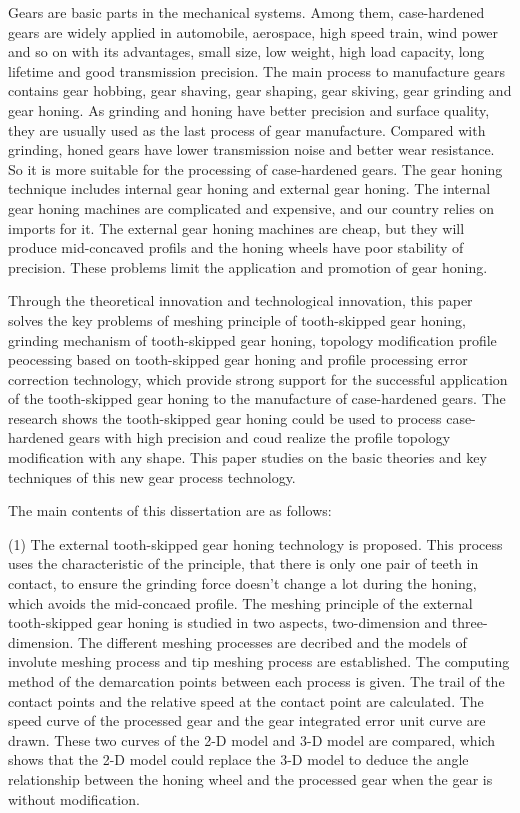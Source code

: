 \begin{enabstract}
  Gears are basic parts in the mechanical systems. Among them, case-hardened
gears are widely applied in automobile, aerospace, high speed train, wind power and
so on with its advantages, small size, low weight, high load capacity, long lifetime and
good transmission precision. The main process to manufacture gears contains gear
hobbing, gear shaving, gear shaping, gear skiving, gear grinding and gear honing. As
grinding and honing have better precision and surface quality, they are usually used as
the last process of gear manufacture. Compared with grinding, honed gears have
lower transmission noise and better wear resistance. So it is more suitable for the
processing of case-hardened gears. The gear honing technique includes internal gear
honing and external gear honing. The internal gear honing machines are complicated
and expensive, and our country relies on imports for it. The external gear honing
machines are cheap, but they will produce mid-concaved profils and the honing
wheels have poor stability of precision. These problems limit the application and
promotion of gear honing.

Through the theoretical innovation and technological innovation, this paper
solves the key problems of meshing principle of tooth-skipped gear honing, grinding
mechanism of tooth-skipped gear honing, topology modification profile peocessing
based on tooth-skipped gear honing and profile processing error correction technology,
which provide strong support for the successful application of the tooth-skipped gear
honing to the manufacture of case-hardened gears. The research shows the
tooth-skipped gear honing could be used to process case-hardened gears with high
precision and coud realize the profile topology modification with any shape. This
paper studies on the basic theories and key techniques of this new gear process
technology.

The main contents of this dissertation are as follows:

(1) The external tooth-skipped gear honing technology is proposed. This process
uses the characteristic of the principle, that there is only one pair of teeth in contact, to
ensure the grinding force doesn’t change a lot during the honing, which avoids the
mid-concaed profile. The meshing principle of the external tooth-skipped gear honing
is studied in two aspects, two-dimension and three-dimension. The different meshing
processes are decribed and the models of involute meshing process and tip meshing
process are established. The computing method of the demarcation points between
each process is given. The trail of the contact points and the relative speed at the
contact point are calculated. The speed curve of the processed gear and the gear
integrated error unit curve are drawn. These two curves of the 2-D model and 3-D
model are compared, which shows that the 2-D model could replace the 3-D model to
deduce the angle relationship between the honing wheel and the processed gear when
the gear is without modification.


\end{enabstract}
